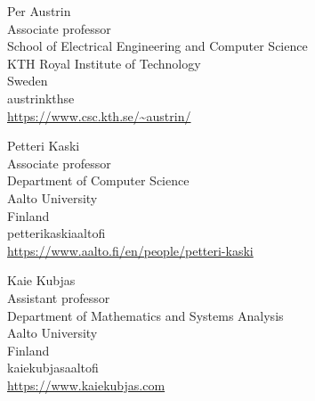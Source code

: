 \documentclass{toc}
\begin{document}
%
%
%
%


%
%
%
%
%
\begin{tocauthors}
\begin{tocinfo}[austrin]
  Per Austrin\\
  Associate professor\\
  School of Electrical Engineering and Computer Science\\
  KTH Royal Institute of Technology\\
  Sweden\\
  austrin\tocat{}kth\tocdot{}se \\   %
  \url{https://www.csc.kth.se/~austrin/}        %
\end{tocinfo}
\begin{tocinfo}[kaski]
  Petteri Kaski\\
  Associate professor\\
  Department of Computer Science\\
  Aalto University\\
  Finland\\
  petteri\tocdot{}kaski\tocat{}aalto\tocdot{}fi \\   %
  \url{https://www.aalto.fi/en/people/petteri-kaski}   %
\end{tocinfo}
\begin{tocinfo}[kubjas]
  Kaie Kubjas\\
  Assistant professor\\
  Department of Mathematics and Systems Analysis\\
  Aalto University\\
  Finland\\
  kaie\tocdot{}kubjas\tocat{}aalto\tocdot{}fi \\   %
 \url{https://www.kaiekubjas.com}      %
\end{tocinfo}

\end{tocauthors}
\end{document}
